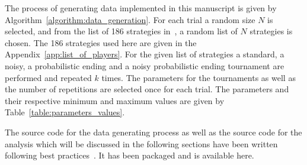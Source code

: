 \documentclass{article}
\begin{document}
The process of generating data implemented in this manuscript is given by
Algorithm~\ref{algorithm:data_generation}. For each trial a random
size \(N\) is selected, and from the list of 186 strategies
in~\cite{axelrodproject}, a random list of \(N\) strategies is chosen. The 186
strategies used here are given in the Appendix~\ref{app:list_of_players}. For the
given list of strategies a standard, a noisy, a probabilistic ending and a noisy
probabilistic ending tournament are performed and repeated \(k\) times.
The parameters for the tournaments as well as the number of repetitions are
selected once for each trial. The parameters and their respective minimum and
maximum values are given by Table~\ref{table:parameters_values}.

\begin{table}[!htbp]
    \begin{center}
    \end{center}
    \caption{Data generation parameters' values}
    \label{table:parameters_values}
\end{table}

The source code for the data generating process as well as the source code for
the analysis which will be discussed in the following sections have been written
following best practices~\cite{Aberdour2007, Benureau2018}. It has been packaged
and is available here.
\end{document}
